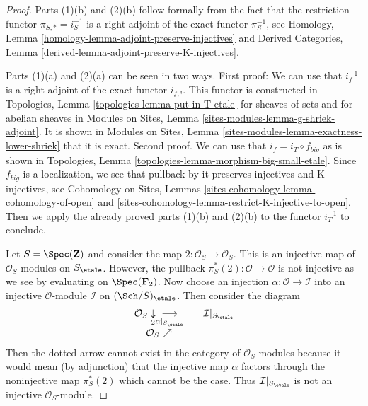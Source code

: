 \begin{proof}
Parts (1)(b) and (2)(b)
follow formally from the fact that the restriction functor
$\pi_{S, *} = i_S^{-1}$ is a right adjoint of the exact functor
$\pi_S^{-1}$, see
Homology, Lemma \ref{homology-lemma-adjoint-preserve-injectives} and
Derived Categories, Lemma \ref{derived-lemma-adjoint-preserve-K-injectives}.

\medskip\noindent
Parts (1)(a) and (2)(a) can be seen in two ways. First proof: We can use
that $i_f^{-1}$ is a right adjoint of the exact functor $i_{f, !}$.
This functor is constructed in
Topologies, Lemma \ref{topologies-lemma-put-in-T-etale}
for sheaves of sets and for abelian sheaves in
Modules on Sites, Lemma \ref{sites-modules-lemma-g-shriek-adjoint}.
It is shown in Modules on Sites, Lemma
\ref{sites-modules-lemma-exactness-lower-shriek} that it is exact.
Second proof. We can use that $i_f = i_T \circ f_{big}$ as is shown
in Topologies, Lemma \ref{topologies-lemma-morphism-big-small-etale}.
Since $f_{big}$ is a localization, we see that pullback by it
preserves injectives and K-injectives, see
Cohomology on Sites, Lemmas \ref{sites-cohomology-lemma-cohomology-of-open} and
\ref{sites-cohomology-lemma-restrict-K-injective-to-open}.
Then we apply the already proved parts (1)(b) and (2)(b)
to the functor $i_T^{-1}$ to conclude.

\medskip\noindent
Let $S = \Spec(\mathbf{Z})$ and consider the map
$2 : \mathcal{O}_S \to \mathcal{O}_S$. This is an injective map
of $\mathcal{O}_S$-modules on $S_\etale$. However, the pullback
$\pi_S^*(2) : \mathcal{O} \to \mathcal{O}$ is not injective
as we see by evaluating on $\Spec(\mathbf{F}_2)$. Now choose
an injection $\alpha : \mathcal{O} \to \mathcal{I}$ into an injective
$\mathcal{O}$-module $\mathcal{I}$ on $(\Sch/S)_\etale$.
Then consider the diagram
$$
\begin{array}{ccc}\mathcal{O}_S \underset{2}{\downarrow}\underset{\alpha|_{S_\etale}}{\longrightarrow} &  & \mathcal{I}|_{S_\etale} \\ \mathcal{O}_S \nearrow &  & \end{array}
$$
Then the dotted arrow cannot exist in the category of $\mathcal{O}_S$-modules
because it would mean
(by adjunction) that the injective map $\alpha$ factors through
the noninjective map $\pi_S^*(2)$ which cannot be the case.
Thus $\mathcal{I}|_{S_\etale}$ is not an injective $\mathcal{O}_S$-module.
\end{proof}

